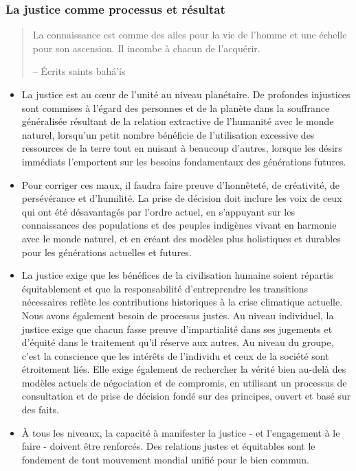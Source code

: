 \documentclass[11pt,xcolor={dvipsnames},hyperref={pdftex,pdfpagemode=UseNone,hidelinks,pdfdisplaydoctitle=true},usepdftitle=false]{beamer}
\begin{document}
\begin{frame}[allowframebreaks=0.8]
  \frametitle{La justice comme processus et résultat}
  \begin{quote}
    La connaissance est comme des ailes pour la vie de l’homme et une échelle
    pour son ascension. Il incombe à chacun de l’acquérir.

    \raggedleft -- Écrits saints bahá’ís
  \end{quote}
  \begin{itemize}
    \item La justice est au cœur de l'unité au niveau planétaire. De profondes
      injustices sont commises à l'égard des personnes et de la planète dans la
      souffrance généralisée résultant de la relation extractive de l'humanité
      avec le monde naturel, lorsqu'un petit nombre bénéficie de l'utilisation
      excessive des ressources de la terre tout en nuisant à beaucoup d'autres,
      lorsque les désirs immédiats l'emportent sur les besoins fondamentaux des
      générations futures.
    \item Pour corriger ces maux, il faudra faire preuve d'honnêteté, de
      créativité, de persévérance et d'humilité. La prise de décision doit
      inclure les voix de ceux qui ont été désavantagés par l'ordre actuel, en
      s'appuyant sur les connaissances des populations et des peuples indigènes
      vivant en harmonie avec le monde naturel, et en créant des modèles plus
      holistiques et durables pour les générations actuelles et futures.
    \item La justice exige que les bénéfices de la civilisation humaine soient
      répartis équitablement et que la responsabilité d'entreprendre les
      transitions nécessaires reflète les contributions historiques à la crise
      climatique actuelle. Nous avons également besoin de processus justes. Au
      niveau individuel, la justice exige que chacun fasse preuve d'impartialité
      dans ses jugements et d'équité dans le traitement qu'il réserve aux
      autres. Au niveau du groupe, c'est la conscience que les intérêts de
      l'individu et ceux de la société sont étroitement liés. Elle exige
      également de rechercher la vérité bien au-delà des modèles actuels de
      négociation et de compromis, en utilisant un processus de consultation et
      de prise de décision fondé sur des principes, ouvert et basé sur des
      faits.
    \item À tous les niveaux, la capacité à manifester la justice - et
      l'engagement à le faire - doivent être renforcés. Des relations justes et
      équitables sont le fondement de tout mouvement mondial unifié pour le
      bien commun.
  \end{itemize}
\end{frame}
\end{document}
